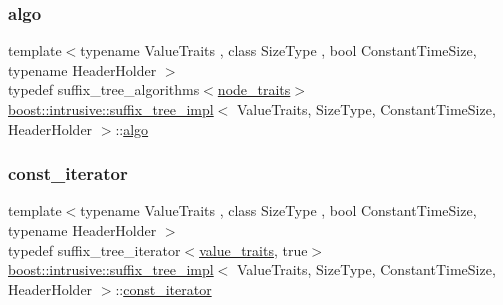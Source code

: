 \subsubsection{\texorpdfstring{algo}{algo}}
{\footnotesize\ttfamily template$<$typename Value\+Traits , class Size\+Type , bool Constant\+Time\+Size, typename Header\+Holder $>$ \\
typedef suffix\+\_\+tree\+\_\+algorithms$<$\hyperlink{classboost_1_1intrusive_1_1suffix__tree__impl_a4fac695b2c8ea16789711a9840af44c4}{node\+\_\+traits}$>$ \hyperlink{classboost_1_1intrusive_1_1suffix__tree__impl}{boost\+::intrusive\+::suffix\+\_\+tree\+\_\+impl}$<$ Value\+Traits, Size\+Type, Constant\+Time\+Size, Header\+Holder $>$\+::\hyperlink{classboost_1_1intrusive_1_1suffix__tree__impl_a3e079dda4e4422ad9c911470f3e8c7e2}{algo}}

\mbox{\label{classboost_1_1intrusive_1_1suffix__tree__impl_a221fd6a26db0f6aa44951317caa66126}} 
\subsubsection{\texorpdfstring{const\+\_\+iterator}{const\_iterator}}
{\footnotesize\ttfamily template$<$typename Value\+Traits , class Size\+Type , bool Constant\+Time\+Size, typename Header\+Holder $>$ \\
typedef suffix\+\_\+tree\+\_\+iterator$<$\hyperlink{classboost_1_1intrusive_1_1suffix__tree__impl_a30d9e164c38c11cd38917ad14e9f3e88}{value\+\_\+traits}, true$>$ \hyperlink{classboost_1_1intrusive_1_1suffix__tree__impl}{boost\+::intrusive\+::suffix\+\_\+tree\+\_\+impl}$<$ Value\+Traits, Size\+Type, Constant\+Time\+Size, Header\+Holder $>$\+::\hyperlink{classboost_1_1intrusive_1_1suffix__tree__impl_a221fd6a26db0f6aa44951317caa66126}{const\+\_\+iterator}}

\mbox{\label{classboost_1_1intrusive_1_1suffix__tree__impl_a5cf354495727a0b22948de4115d0a2b8}} 
